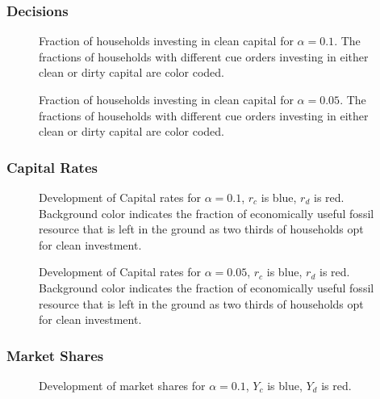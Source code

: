 \subsubsection{Decisions}
\begin{figure}[t]
	\centering
	\caption{Fraction of households investing in clean capital for $\alpha=0.1$. The fractions of households with different cue orders investing in either clean or dirty capital are color coded.}
	\label{5o3_1}
\end{figure}
\begin{figure}[t]
	\centering
	\caption{Fraction of households investing in clean capital for $\alpha=0.05$. The fractions of households with different cue orders investing in either clean or dirty capital are color coded.}
	\label{5o3_2}
\end{figure} 
\subsubsection{Capital Rates}
\begin{figure}[t]
	\centering
	\caption{Development of Capital rates for $\alpha=0.1$, $r_c$ is blue, $r_d$ is red. Background color indicates the fraction of economically useful fossil resource that is left in the ground as two thirds of households opt for clean investment.}
	\label{5o3_3}
\end{figure}

\begin{figure}[t]
	\centering
	\caption{Development of Capital rates for $\alpha=0.05$, $r_c$ is blue, $r_d$ is red. Background color indicates the fraction of economically useful fossil resource that is left in the ground as two thirds of households opt for clean investment.}

\end{figure}
\subsubsection{Market Shares}
\begin{figure}[t]
	\centering
	\caption{Development of market shares for $\alpha=0.1$, $Y_c$ is blue, $Y_d$ is red.}

\end{figure}


